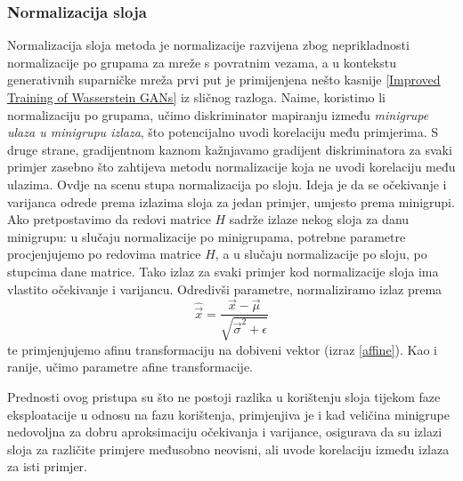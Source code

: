 \subsubsection{Normalizacija sloja}
Normalizacija sloja  metoda je normalizacije razvijena zbog neprikladnosti normalizacije po grupama za mreže s povratnim vezama, a u kontekstu generativnih suparničke mreža prvi put je primijenjena nešto kasnije \ref{Improved Training of Wasserstein GANs} iz sličnog razloga. Naime, koristimo li normalizaciju po grupama, učimo diskriminator mapiranju između \textit{minigrupe ulaza u minigrupu izlaza}, što potencijalno uvodi korelaciju među primjerima. S druge strane, gradijentnom kaznom kažnjavamo gradijent diskriminatora za svaki primjer zasebno što zahtijeva metodu normalizacije koja ne uvodi korelaciju među ulazima. Ovdje na scenu stupa normalizacija po sloju. Ideja je da se očekivanje i varijanca odrede prema izlazima sloja za jedan primjer, umjesto prema minigrupi. Ako pretpostavimo da redovi matrice $H$ sadrže izlaze nekog sloja za danu minigrupu: u slučaju normalizacije po minigrupama, potrebne parametre procjenjujemo po redovima matrice $H$, a u slučaju normalizacije po sloju, po stupcima dane matrice. Tako izlaz za svaki primjer kod normalizacije sloja ima vlastito očekivanje i varijancu. Odredivši parametre, normaliziramo izlaz prema
\begin{equation}
\hat{\vec{x}} = \frac{\vec{x} - \vec{\mu}}{\sqrt{\vec{\sigma}^2 + \epsilon}}
\end{equation}
te primjenjujemo afinu transformaciju na dobiveni vektor (izraz \ref{affine}). Kao i ranije, učimo parametre afine transformacije.

Prednosti ovog pristupa su što ne postoji razlika u korištenju sloja tijekom faze eksploatacije u odnosu na fazu korištenja, primjenjiva je i kad veličina minigrupe nedovoljna za dobru aproksimaciju očekivanja i varijance, osigurava da su izlazi sloja za različite primjere međusobno neovisni, ali uvode korelaciju između izlaza za isti primjer.